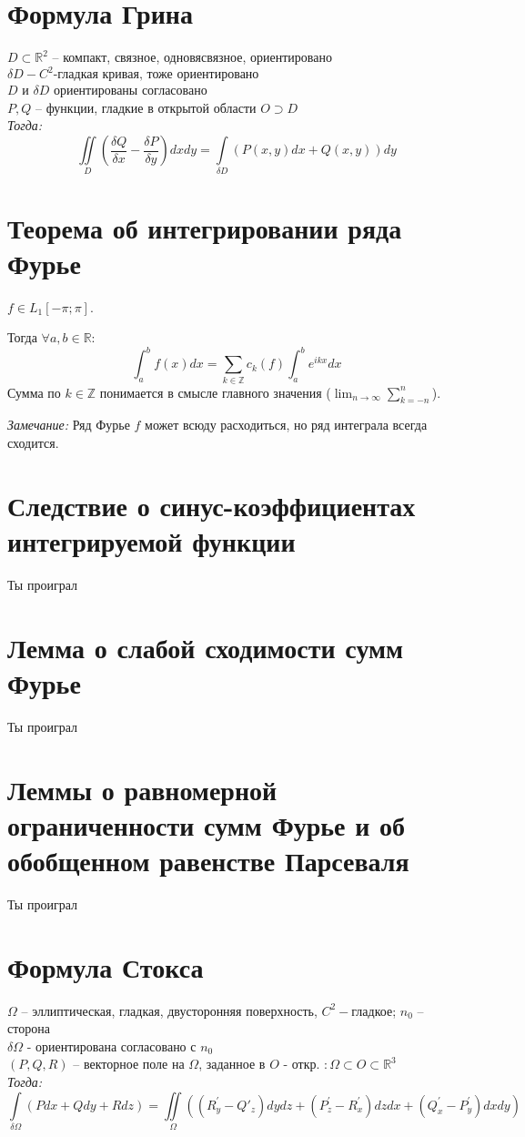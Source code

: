 \documentclass[paper=a4, fontsize=14pt]{report}
\begin{document}
        \section{Формула Грина}
        $D \subset \mathds{R}^2$ -- компакт, связное, одновясвязное, ориентировано\\$\delta D-C^2\text{-гладкая кривая, тоже ориентировано}$\\
        $D$ и $\delta D$ ориентированы согласовано \\
        $P, Q$ -- функции, гладкие в открытой области $O \supset D$ \\
        \emph{Тогда:} $$\iint\limits_{D}(\frac{\delta Q}{\delta x} - \frac{\delta P}{\delta y})dxdy = \int\limits_{\delta D}(P(x,y)dx + Q(x,y))dy$$

    \section{Теорема об интегрировании ряда Фурье}
    $f \in L_1[-\pi;\pi]$.

    Тогда $\forall a, b \in \mathbb{R}$:
    $$\int_a^b f(x)dx = \sum_{k\in\mathbb{Z}} c_k(f) \int_a^b e^{ikx} dx$$
    Сумма по $k \in \mathbb{Z}$ понимается в смысле главного значения ($\lim_{n \to \infty} \sum_{k=-n}^n$).

    \emph{Замечание:} Ряд Фурье $f$ может всюду расходиться, но ряд интеграла всегда сходится.
    \section{Следствие о синус-коэффициентах интегрируемой функции}
    Ты проиграл
    
    \section{Лемма о слабой сходимости сумм Фурье}
    Ты проиграл
    
    \section{Леммы о равномерной ограниченности сумм Фурье и об обобщенном равенстве Парсеваля}
    Ты проиграл
    
    \section{Формула Стокса}
    $\Omega$ -- эллиптическая, гладкая, двусторонняя поверхность, $C^2-$гладкое; $n_0$ -- сторона\\
    $\delta \Omega$ - ориентирована согласовано с $n_0$\\
    $(P,Q,R)$ -- векторное поле на $\Omega$, заданное в $O$ - откр. $: \Omega \subset O\subset \mathds{R}^3$ \\
    \emph{Тогда:} $$\int\limits_{\delta \Omega}(Pdx + Qdy+Rdz) =
    \iint\limits_{\Omega}((R^{'}_y- Q{'}_z)dydz
    +(P^{'}_z-R^{'}_x)dzdx + (Q^{'}_x-P^{'}_y)dxdy)$$
\end{document}
